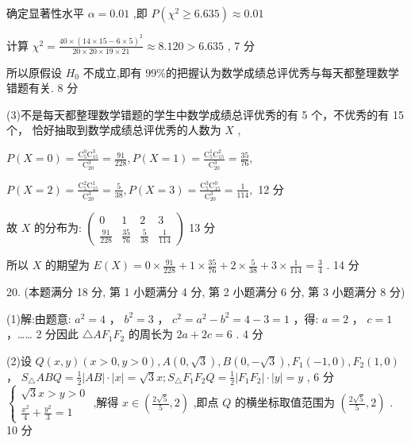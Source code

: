 \documentclass[10pt]{article}
\begin{document}
确定显著性水平 \(\alpha  = {0.01}\) ,即 \(P\left( {{\chi }^{2} \geq  {6.635}}\right)  \approx  {0.01}\)

计算 \({\chi }^{2} = \frac{{40} \times  {\left( {14} \times  {15} - 6 \times  5\right) }^{2}}{{20} \times  {20} \times  {19} \times  {21}} \approx  {8.120} > {6.635}\) , 7 分

所以原假设 \({H}_{0}\) 不成立,即有 99\%的把握认为数学成绩总评优秀与每天都整理数学错题有关. 8 分

(3)不是每天都整理数学错题的学生中数学成绩总评优秀的有 5 个，不优秀的有 15 个， 恰好抽取到数学成绩总评优秀的人数为 \(X\) ,

\(P\left( {X = 0}\right)  = \frac{{\mathrm{C}}_{5}^{0}{\mathrm{C}}_{15}^{3}}{{\mathrm{C}}_{20}^{3}} = \frac{91}{228},P\left( {X = 1}\right)  = \frac{{\mathrm{C}}_{5}^{1}{\mathrm{C}}_{15}^{2}}{{\mathrm{C}}_{20}^{3}} = \frac{35}{76},\)

\(P\left( {X = 2}\right)  = \frac{{\mathrm{C}}_{5}^{2}{\mathrm{C}}_{15}^{1}}{{\mathrm{C}}_{20}^{3}} = \frac{5}{38},P\left( {X = 3}\right)  = \frac{{\mathrm{C}}_{5}^{3}{\mathrm{C}}_{15}^{0}}{{\mathrm{C}}_{20}^{3}} = \frac{1}{114},\) 12 分

故 \(X\) 的分布为: \(\left( \begin{matrix} 0 & 1 & 2 & 3 \\  \frac{91}{228} & \frac{35}{76} & \frac{5}{38} & \frac{1}{114} \end{matrix}\right)\) 13 分

所以 \(X\) 的期望为 \(E\left( X\right)  = 0 \times  \frac{91}{228} + 1 \times  \frac{35}{76} + 2 \times  \frac{5}{38} + 3 \times  \frac{1}{114} = \frac{3}{4}\) . 14 分

20. (本题满分 18 分, 第 1 小题满分 4 分, 第 2 小题满分 6 分, 第 3 小题满分 8 分)

(1)解:由题意: \({a}^{2} = 4\) ， \({b}^{2} = 3\) ， \({c}^{2} = {a}^{2} - {b}^{2} = 4 - 3 = 1\) ，得: \(a = 2\) ， \(c = 1\) ，…… 2 分因此 \(\bigtriangleup A{F}_{1}{F}_{2}\) 的周长为 \({2a} + {2c} = 6\) . 4 分

(2)设 \(Q\left( {x,y}\right) \left( {x > 0,y > 0}\right) ,A\left( {0,\sqrt{3}}\right) ,B\left( {0, - \sqrt{3}}\right) ,{F}_{1}\left( {-1,0}\right) ,{F}_{2}\left( {1,0}\right)\) ， \({S}_{\bigtriangleup }{ABQ} = \frac{1}{2}\left| {AB}\right|  \cdot  \left| x\right|  = \sqrt{3}x;{S}_{\bigtriangleup }{F}_{1}{F}_{2}Q = \frac{1}{2}\left| {{F}_{1}{F}_{2}}\right|  \cdot  \left| y\right|  = y\) , 6 分 \(\left\{  {\begin{array}{l} \sqrt{3}x > y > 0 \\  \frac{{x}^{2}}{4} + \frac{{y}^{2}}{3} = 1 \end{array}\text{ ,解得 }x \in  \left( {\frac{2\sqrt{5}}{5},2}\right) }\right.\) ,即点 \(Q\) 的横坐标取值范围为 \(\left( {\frac{2\sqrt{5}}{5},2}\right)\) . 10 分
\end{document}
